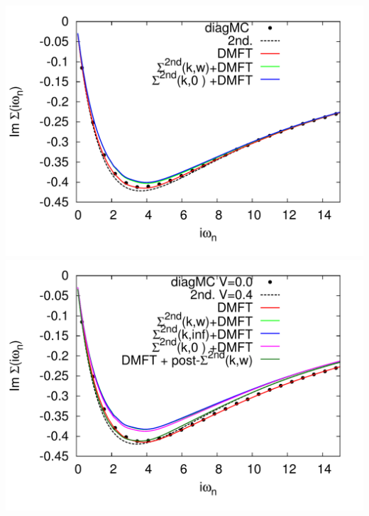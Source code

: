 \documentclass[12pt,a4paper]{scrartcl}
\numberwithin{equation}{section}
\begin{document}
\includegraphics[width=1\textwidth]{figs/dmft2nd_V00.pdf}
\includegraphics[width=1\textwidth]{figs/dmft2nd_V04.pdf}






\clearpage
\end{document}
